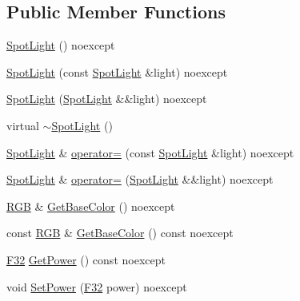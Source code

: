 \subsection*{Public Member Functions}
\begin{DoxyCompactItemize}
\item 
\mbox{\hyperlink{classmage_1_1rendering_1_1_spot_light_abc287714a0bb8f4fab5960b7bcbb4316}{Spot\+Light}} () noexcept
\item 
\mbox{\hyperlink{classmage_1_1rendering_1_1_spot_light_a3e94a01b574efb8af5540e24d7af75c6}{Spot\+Light}} (const \mbox{\hyperlink{classmage_1_1rendering_1_1_spot_light}{Spot\+Light}} \&light) noexcept
\item 
\mbox{\hyperlink{classmage_1_1rendering_1_1_spot_light_a3520d2b04ca636436211e8e4fd929b42}{Spot\+Light}} (\mbox{\hyperlink{classmage_1_1rendering_1_1_spot_light}{Spot\+Light}} \&\&light) noexcept
\item 
virtual \mbox{\hyperlink{classmage_1_1rendering_1_1_spot_light_a3ef5b16d174fd45b40d929b8f06cdea3}{$\sim$\+Spot\+Light}} ()
\item 
\mbox{\hyperlink{classmage_1_1rendering_1_1_spot_light}{Spot\+Light}} \& \mbox{\hyperlink{classmage_1_1rendering_1_1_spot_light_a6bf91b086aa54f2e31d92ed401cf0fdc}{operator=}} (const \mbox{\hyperlink{classmage_1_1rendering_1_1_spot_light}{Spot\+Light}} \&light) noexcept
\item 
\mbox{\hyperlink{classmage_1_1rendering_1_1_spot_light}{Spot\+Light}} \& \mbox{\hyperlink{classmage_1_1rendering_1_1_spot_light_a58ff20b0459ccd6df54c85a361faa5ad}{operator=}} (\mbox{\hyperlink{classmage_1_1rendering_1_1_spot_light}{Spot\+Light}} \&\&light) noexcept
\item 
\mbox{\hyperlink{structmage_1_1_r_g_b}{R\+GB}} \& \mbox{\hyperlink{classmage_1_1rendering_1_1_spot_light_ac86581dd4af14206c11470beec10fe02}{Get\+Base\+Color}} () noexcept
\item 
const \mbox{\hyperlink{structmage_1_1_r_g_b}{R\+GB}} \& \mbox{\hyperlink{classmage_1_1rendering_1_1_spot_light_a66cf454577d92d091f6505f3ff52148f}{Get\+Base\+Color}} () const noexcept
\item 
\mbox{\hyperlink{namespacemage_aa97e833b45f06d60a0a9c4fc22ae02c0}{F32}} \mbox{\hyperlink{classmage_1_1rendering_1_1_spot_light_a835e4624ec959374b099dd07c7398929}{Get\+Power}} () const noexcept
\item 
void \mbox{\hyperlink{classmage_1_1rendering_1_1_spot_light_ac40537f953422276d68053e68df9fbe1}{Set\+Power}} (\mbox{\hyperlink{namespacemage_aa97e833b45f06d60a0a9c4fc22ae02c0}{F32}} power) noexcept

\end{DoxyCompactItemize}
